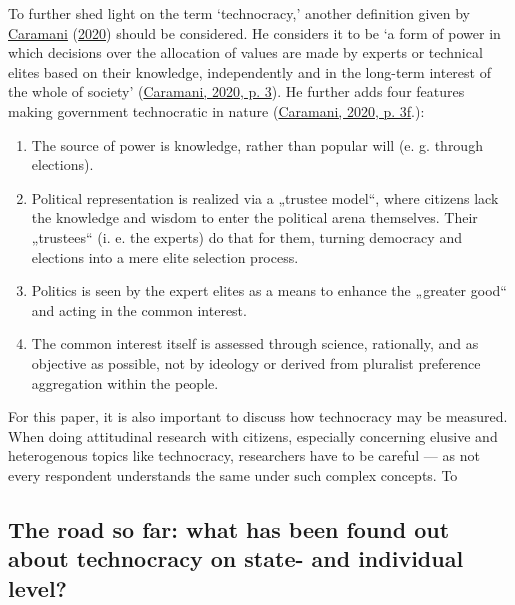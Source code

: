 \documentclass[
  12pt,
  english,
]{article}
\begin{document}
To further shed light on the term `technocracy,' another definition
given by \protect\hyperlink{ref-caramani2020technocratic}{Caramani}
(\protect\hyperlink{ref-caramani2020technocratic}{2020}) should be
considered. He considers it to be `a form of power in which decisions
over the allocation of values are made by experts or technical elites
based on their knowledge, independently and in the long-term interest of
the whole of society'
(\protect\hyperlink{ref-caramani2020technocratic}{Caramani, 2020, p.
3}). He further adds four features making government technocratic in
nature (\protect\hyperlink{ref-caramani2020technocratic}{Caramani, 2020,
p. 3f}.):

\begin{enumerate}
\def\labelenumi{\arabic{enumi}.}
\item
  The source of power is knowledge, rather than popular will (e. g.
  through elections).
\item
  Political representation is realized via a „trustee model``, where
  citizens lack the knowledge and wisdom to enter the political arena
  themselves. Their „trustees`` (i. e. the experts) do that for them,
  turning democracy and elections into a mere elite selection process.
\item
  Politics is seen by the expert elites as a means to enhance the
  „greater good`` and acting in the common interest.
\item
  The common interest itself is assessed through science, rationally,
  and as objective as possible, not by ideology or derived from
  pluralist preference aggregation within the people.
\end{enumerate}

For this paper, it is also important to discuss how technocracy may be
measured. When doing attitudinal research with citizens, especially
concerning elusive and heterogenous topics like technocracy, researchers
have to be careful --- as not every respondent understands the same
under such complex concepts. To

\hypertarget{the-road-so-far-what-has-been-found-out-about-technocracy-on-state--and-individual-level}{%
\subsection{The road so far: what has been found out about technocracy
on state- and individual
level?}\label{the-road-so-far-what-has-been-found-out-about-technocracy-on-state--and-individual-level}}
\end{document}
